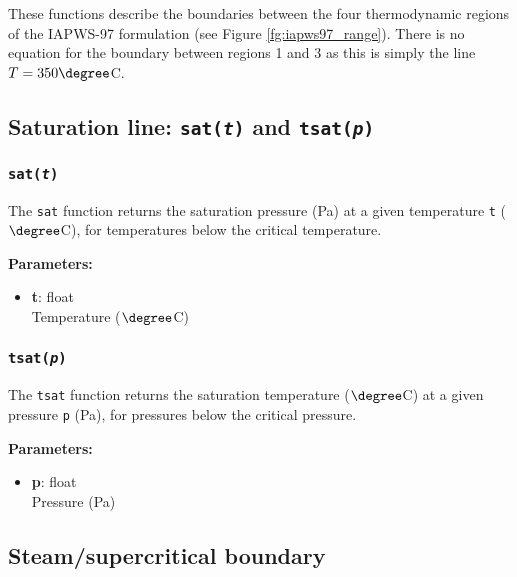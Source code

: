 These functions describe the boundaries between the four thermodynamic regions of the IAPWS-97 formulation (see Figure \ref{fg:iapws97_range}).  There is no equation for the boundary between regions 1 and 3 as this is simply the line $T = 350 \degree$C.

\subsection{Saturation line: \texttt{sat(\emph{t})} and \texttt{tsat(\emph{p})}}

\begin{snugshade}
\subsubsection{\texttt{sat(\emph{t})}}
\end{snugshade}
\label{sec:iapws97:sat}

The \texttt{sat} function returns the saturation pressure (Pa) at a given temperature \texttt{t} ($\degree$C), for temperatures below the critical temperature.

\textbf{Parameters:}
\begin{itemize}
\item \textbf{t}: float\\
  Temperature ($\degree$C)
\end{itemize}

\begin{snugshade}
\subsubsection{\texttt{tsat(\emph{p})}}
\end{snugshade}
\label{sec:iapws97:tsat}

The \texttt{tsat} function returns the saturation temperature ($\degree$C) at a given pressure \texttt{p} (Pa), for pressures below the critical pressure.

\textbf{Parameters:}
\begin{itemize}
\item \textbf{p}: float\\
  Pressure (Pa)
\end{itemize}

\subsection{Steam/supercritical boundary}
\label{region23_boundary}

